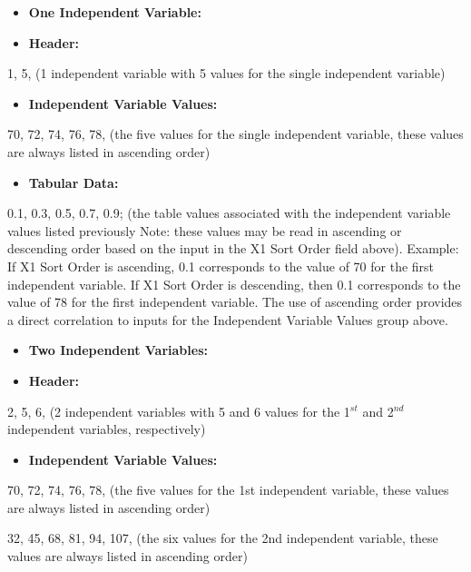 \begin{itemize}
\item
  \textbf{One Independent Variable:}
\item
  \textbf{Header:}
\end{itemize}

1, 5, (1 independent variable with 5 values for the single independent variable)

\begin{itemize}
\tightlist
\item
  \textbf{Independent Variable Values:}
\end{itemize}

70, 72, 74, 76, 78, (the five values for the single independent variable, these values are always listed in ascending order)

\begin{itemize}
\tightlist
\item
  \textbf{Tabular Data:}
\end{itemize}

0.1, 0.3, 0.5, 0.7, 0.9; (the table values associated with the independent variable values listed previously Note: these values may be read in ascending or descending order based on the input in the X1 Sort Order field above). Example: If X1 Sort Order is ascending, 0.1 corresponds to the value of 70 for the first independent variable. If X1 Sort Order is descending, then 0.1 corresponds to the value of 78 for the first independent variable. The use of ascending order provides a direct correlation to inputs for the Independent Variable Values group above.

\begin{itemize}
\item
  \textbf{Two Independent Variables:}
\item
  \textbf{Header:}
\end{itemize}

2, 5, 6, (2 independent variables with 5 and 6 values for the 1\(^{st}\) and 2\(^{nd}\) independent variables, respectively)

\begin{itemize}
\tightlist
\item
  \textbf{Independent Variable Values:}
\end{itemize}

70, 72, 74, 76, 78, (the five values for the 1st independent variable, these values are always listed in ascending order)

32, 45, 68, 81, 94, 107, (the six values for the 2nd independent variable, these values are always listed in ascending order)

